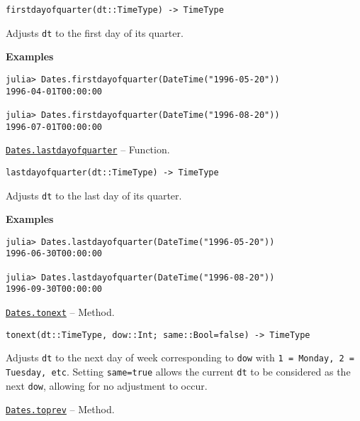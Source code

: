 \begin{adjustwidth}{2em}{0pt}


\begin{verbatim}
firstdayofquarter(dt::TimeType) -> TimeType
\end{verbatim}

Adjusts \texttt{dt} to the first day of its quarter.

\textbf{Examples}


\begin{verbatim}
julia> Dates.firstdayofquarter(DateTime("1996-05-20"))
1996-04-01T00:00:00

julia> Dates.firstdayofquarter(DateTime("1996-08-20"))
1996-07-01T00:00:00
\end{verbatim}



\end{adjustwidth}
\hypertarget{90261086996796964}{}
\hyperlink{90261086996796964}{\texttt{Dates.lastdayofquarter}}  -- {Function.}

\begin{adjustwidth}{2em}{0pt}


\begin{verbatim}
lastdayofquarter(dt::TimeType) -> TimeType
\end{verbatim}

Adjusts \texttt{dt} to the last day of its quarter.

\textbf{Examples}


\begin{verbatim}
julia> Dates.lastdayofquarter(DateTime("1996-05-20"))
1996-06-30T00:00:00

julia> Dates.lastdayofquarter(DateTime("1996-08-20"))
1996-09-30T00:00:00
\end{verbatim}



\end{adjustwidth}
\hypertarget{17785923876137601514}{}
\hyperlink{17785923876137601514}{\texttt{Dates.tonext}}  -- {Method.}

\begin{adjustwidth}{2em}{0pt}


\begin{verbatim}
tonext(dt::TimeType, dow::Int; same::Bool=false) -> TimeType
\end{verbatim}

Adjusts \texttt{dt} to the next day of week corresponding to \texttt{dow} with \texttt{1 = Monday, 2 = Tuesday, etc}. Setting \texttt{same=true} allows the current \texttt{dt} to be considered as the next \texttt{dow}, allowing for no adjustment to occur.



\end{adjustwidth}
\hypertarget{17852506486502639811}{}
\hyperlink{17852506486502639811}{\texttt{Dates.toprev}}  -- {Method.}

